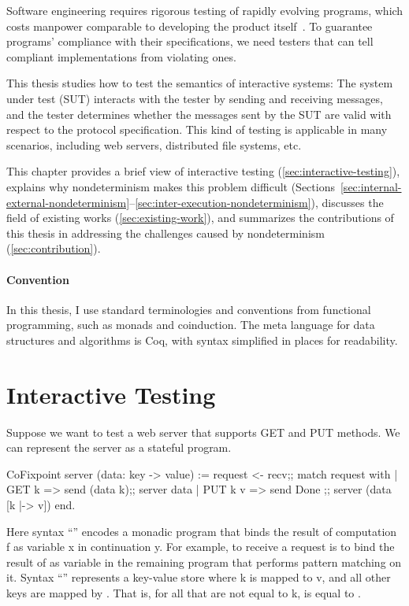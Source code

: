 Software engineering requires rigorous testing of rapidly evolving programs,
which costs manpower comparable to developing the product itself~\cite{vailshery}.  To guarantee
programs' compliance with their specifications, we need testers that can tell
compliant implementations from violating ones.

This thesis studies how to test the semantics of interactive systems: The system
under test (SUT) interacts with the tester by sending and receiving messages,
and the tester determines whether the messages sent by the SUT are valid with
respect to the protocol specification.  This kind of testing is applicable in
many scenarios, including web servers, distributed file systems, etc.

This chapter provides a brief view of interactive testing
(\autoref{sec:interactive-testing}), explains why nondeterminism makes this
problem difficult
(Sections~\ref{sec:internal-external-nondeterminism}--\ref{sec:inter-execution-nondeterminism}),
discusses the field of existing works (\autoref{sec:existing-work}), and
summarizes the contributions of this thesis in addressing the challenges caused
by nondeterminism (\autoref{sec:contribution}).

\paragraph{Convention}
In this thesis, I use standard terminologies and conventions from functional
programming, such as monads and coinduction.  The meta language for data
structures and algorithms is Coq, with syntax simplified in places for
readability.

\section{Interactive Testing}
\label{sec:interactive-testing}
Suppose we want to test a web server that supports GET and PUT methods.  We can
represent the server as a stateful program.
\begin{coq}
  CoFixpoint server (data: key -> value) :=
    request <- recv;;
    match request with
    | GET k   => send (data k);; server  data
    | PUT k v => send  Done   ;; server (data [k |-> v])
    end.
\end{coq}
Here syntax ``'' encodes a monadic program that binds the result
of computation \ilc f as variable \ilc x in continuation \ilc y.  For example,
to receive a request is to bind the result of  as variable
 in the remaining program that performs pattern matching on it.
Syntax ``'' represents a key-value store where \ilc k is
mapped to \ilc v, and all other keys are mapped by .  That is, for
all  that are not equal to \ilc k,  is equal
to .

